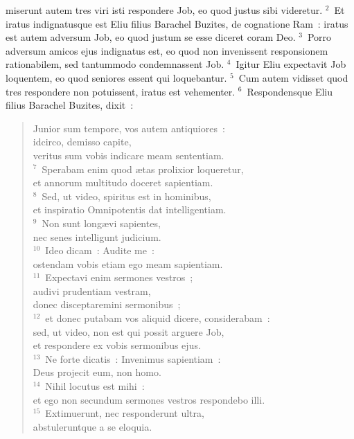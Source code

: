 \bchapter
{}miserunt autem tres viri isti respondere Job, eo quod justus sibi videretur.
${}^{2}$~Et iratus indignatusque est Eliu filius Barachel Buzites, de cognatione Ram~: iratus est autem adversum Job, eo quod justum se esse diceret coram Deo.
${}^{3}$~Porro adversum amicos ejus indignatus est, eo quod non invenissent responsionem rationabilem, sed tantummodo condemnassent Job.
${}^{4}$~Igitur Eliu expectavit Job loquentem, eo quod seniores essent qui loquebantur.
${}^{5}$~Cum autem vidisset quod tres respondere non potuissent, iratus est vehementer.
${}^{6}$~Respondensque Eliu filius Barachel Buzites, dixit~: \begin{flushleft}\begin{verse}Junior sum tempore, vos autem antiquiores~:\\ idcirco, demisso capite,\\ veritus sum vobis indicare meam sententiam.\\
${}^{7}$~Sperabam enim quod \ae tas prolixior loqueretur,\\ et annorum multitudo doceret sapientiam.\\
${}^{8}$~Sed, ut video, spiritus est in hominibus,\\ et inspiratio Omnipotentis dat intelligentiam.\\
${}^{9}$~Non sunt long\ae vi sapientes,\\ nec senes intelligunt judicium.\\
${}^{10}$~Ideo dicam~: Audite me~:\\ ostendam vobis etiam ego meam sapientiam.\\
${}^{11}$~Expectavi enim sermones vestros~;\\ audivi prudentiam vestram,\\ donec disceptaremini sermonibus~;\\
${}^{12}$~et donec putabam vos aliquid dicere, considerabam~:\\ sed, ut video, non est qui possit arguere Job,\\ et respondere ex vobis sermonibus ejus.\\
${}^{13}$~Ne forte dicatis~: Invenimus sapientiam~:\\ Deus projecit eum, non homo.\\
${}^{14}$~Nihil locutus est mihi~:\\ et ego non secundum sermones vestros respondebo illi.\\
${}^{15}$~Extimuerunt, nec responderunt ultra,\\ abstuleruntque a se eloquia.\\

\end{verse}
\end{flushleft}
